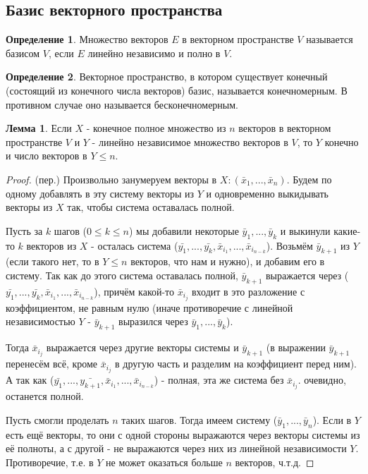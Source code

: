 \documentclass[a4paper, 12pt]{article}
\theoremstyle{definition}
\newtheorem*{definition}{Определение}
\newtheorem*{lemma}{Лемма}
\begin{document}
	\subsection{Базис векторного пространства}
	\begin{definition}
		Множество векторов $E$ в векторном пространстве $V$ называется базисом $V$, если $E$ линейно независимо и полно в $V$.
	\end{definition}
	\begin{definition}
		Векторное пространство, в котором существует конечный (состоящий из конечного числа векторов) базис, называется конечномерным. В противном случае оно называется бесконечномерным. 
	\end{definition}
	\begin{lemma}
		Если $X$ - конечное полное множество из $n$ векторов в векторном пространстве $V$ и $Y$ - линейно независимое множество векторов в $V$, то $Y$ конечно и число векторов в $Y \leqslant n$. 
	\end{lemma}
	\begin{proof}
		(пер.)
		Произвольно занумеруем векторы в $X: (\bar{x}_{1},...,\bar{x}_{n})$.
		Будем по одному добавлять в эту систему векторы из $Y$ и одновременно выкидывать векторы из $X$ так, чтобы система оставалась полной.
		
		Пусть за $k$ шагов ($0\leqslant k \leqslant n$) мы добавили некоторые $\bar{y}_{1},...,\bar{y}_{k}$ и выкинули какие-то $k$ векторов из $X$ - осталась система ($\bar{y_{1}},...,\bar{y_{k}},\bar{x}_{i_{1}},...,\bar{x}_{i_{n-k}}$).
		Возьмём $\bar{y}_{k+1}$ из $Y$ (если такого нет, то в $Y \leqslant n$ векторов, что нам и нужно), и добавим его в систему. Так как до этого система оставалась полной, $\bar{y}_{k+1}$ выражается через ($\bar{y_{1}},...,\bar{y_{k}},\bar{x}_{i_{1}},...,\bar{x}_{i_{n-k}}$), причём какой-то $\bar{x}_{i_{j}}$ входит в это разложение с коэффициентом, не равным нулю (иначе противоречие с линейной независимостью $Y$ - $\bar{y}_{k+1}$ выразился через $\bar{y}_{1},...,\bar{y}_{k}$).
		
		Тогда $\bar{x}_{i_{j}}$ выражается через другие векторы системы и $\bar{y}_{k+1}$ (в выражении $\bar{y}_{k+1}$ перенесём всё, кроме $\bar{x}_{i_{j}}$ в другую часть и разделим на коэффициент перед ним).
		А так как ($\bar{y_{1}},...,\bar{y_{k+1}},\bar{x}_{i_{1}},...,\bar{x}_{i_{n-k}}$) - полная, эта же система без $\bar{x}_{i_{j}}$. очевидно, останется полной.

		Пусть смогли проделать $n$ таких шагов. Тогда имеем систему ($\bar{y}_{1},...,\bar{y}_n$). Если в $Y$ есть ещё векторы, то они с одной стороны выражаются через векторы системы из её полноты, а с другой - не выражаются через них из линейной независимости $Y$. Противоречие, т.е. в $Y$ не может оказаться больше $n$ векторов, ч.т.д.   
	\end{proof}
\end{document}
